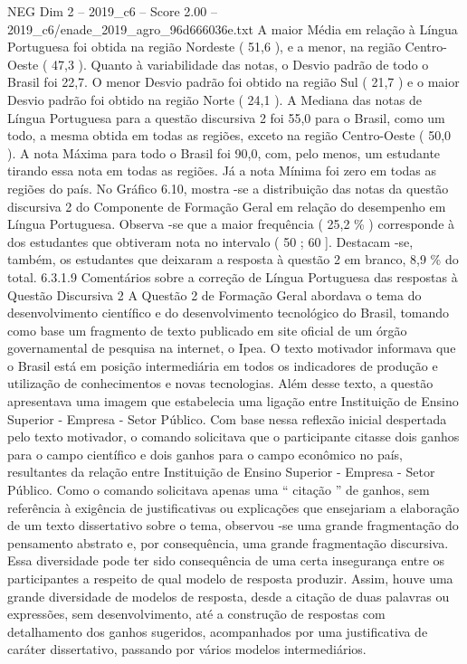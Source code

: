 \begin{textsample}{NEG Dim 2 – 2019\_c6 – Score 2.00 – 2019\_c6/enade\_2019\_agro\_96d666036e.txt}
A maior Média em relação à Língua Portuguesa foi obtida na região Nordeste ( 51,6 ), e a menor, na região Centro-Oeste ( 47,3 ).
Quanto à variabilidade das notas, o Desvio padrão de todo o Brasil foi 22,7.
O menor Desvio padrão foi obtido na região Sul ( 21,7 ) e o maior Desvio padrão foi obtido na região Norte ( 24,1 ).
A Mediana das notas de Língua Portuguesa para a questão discursiva 2 foi 55,0 para o Brasil, como um todo, a mesma obtida em todas as regiões, exceto na região Centro-Oeste ( 50,0 ).
A nota Máxima para todo o Brasil foi 90,0, com, pelo menos, um estudante tirando essa nota em todas as regiões.
Já a nota Mínima foi zero em todas as regiões do país.
No Gráfico 6.10, mostra -se a distribuição das notas da questão discursiva 2 do Componente de Formação Geral em relação do desempenho em Língua Portuguesa.
Observa -se que a maior frequência ( 25,2 \% ) corresponde à dos estudantes que obtiveram nota no intervalo ( 50 ; 60 ].
Destacam -se, também, os estudantes que deixaram a resposta à questão 2 em branco, 8,9 \% do total. 6.3.1.9 Comentários sobre a correção de Língua Portuguesa das respostas à Questão Discursiva 2 A Questão 2 de Formação Geral abordava o tema do desenvolvimento científico e do desenvolvimento tecnológico do Brasil, tomando como base um fragmento de texto publicado em site oficial de um órgão governamental de pesquisa na internet, o Ipea.
O texto motivador informava que o Brasil está em posição intermediária em todos os indicadores de produção e utilização de conhecimentos e novas tecnologias.
Além desse texto, a questão apresentava uma imagem que estabelecia uma ligação entre Instituição de Ensino Superior - Empresa - Setor Público.
Com base nessa reflexão inicial despertada pelo texto motivador, o comando solicitava que o participante citasse dois ganhos para o campo científico e dois ganhos para o campo econômico no país, resultantes da relação entre Instituição de Ensino Superior - Empresa - Setor Público.
Como o comando solicitava apenas uma “ citação ” de ganhos, sem referência à exigência de justificativas ou explicações que ensejariam a elaboração de um texto dissertativo sobre o tema, observou -se uma grande fragmentação do pensamento abstrato e, por consequência, uma grande fragmentação discursiva.
Essa diversidade pode ter sido consequência de uma certa insegurança entre os participantes a respeito de qual modelo de resposta produzir.
Assim, houve uma grande diversidade de modelos de resposta, desde a citação de duas palavras ou expressões, sem desenvolvimento, até a construção de respostas com detalhamento dos ganhos sugeridos, acompanhados por uma justificativa de caráter dissertativo, passando por vários modelos intermediários.

\end{textsample}
